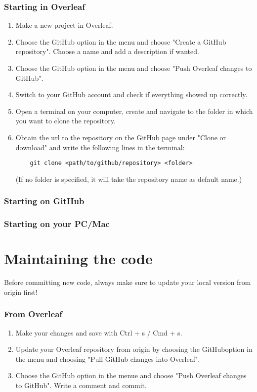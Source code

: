 \documentclass{article}
\begin{document}
\subsubsection{Starting in Overleaf}

\begin{enumerate}
    \item Make a new project in Overleaf.
    \item Choose the GitHub option in the menu and choose "Create a GitHub repository". Choose a name and add a description if wanted.
    \item Choose the GitHub option in the menu and choose "Push Overleaf changes to GitHub".
    \item Switch to your GitHub account and check if everything showed up correctly.
    \item Open a terminal on your computer, create and navigate to the folder in which you want to clone the repository.
    \item Obtain the url to the repository on the GitHub page under "Clone or download" and write the following lines in the terminal: 
    \begin{verbatim}
    git clone <path/to/github/repository> <folder>
    \end{verbatim}
    (If no folder is specified, it will take the repository name as default name.)
\end{enumerate}

\subsubsection{Starting on GitHub}

\subsubsection{Starting on your PC/Mac}

\section{Maintaining the code}

Before committing new code, always make sure to update your local version from origin first!

\subsubsection{From Overleaf}

\begin{enumerate}
    \item Make your changes and save with Ctrl + s / Cmd + s.
    \item Update your Overleaf repository from origin by choosing the GitHuboption in the menu and choosing "Pull GitHub changes into Overleaf".
    \item Choose the GitHub option in the menue and choose "Push Overleaf changes to GitHub". Write a comment and commit.
\end{enumerate}
\end{document}
